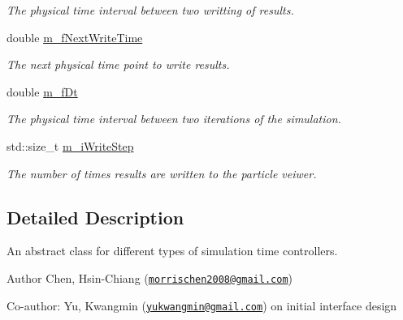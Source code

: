 \begin{DoxyCompactItemize}
\begin{DoxyCompactList}\small\item\em The physical time interval between two writting of results. \end{DoxyCompactList}\item 
\hypertarget{classTimeController_a497f8f5542f43a7a0975bf090ad0d232}{double \hyperlink{classTimeController_a497f8f5542f43a7a0975bf090ad0d232}{m\-\_\-f\-Next\-Write\-Time}}\label{classTimeController_a497f8f5542f43a7a0975bf090ad0d232}

\begin{DoxyCompactList}\small\item\em The next physical time point to write results. \end{DoxyCompactList}\item 
\hypertarget{classTimeController_acd5be58667699b78c72210dd05425c19}{double \hyperlink{classTimeController_acd5be58667699b78c72210dd05425c19}{m\-\_\-f\-Dt}}\label{classTimeController_acd5be58667699b78c72210dd05425c19}

\begin{DoxyCompactList}\small\item\em The physical time interval between two iterations of the simulation. \end{DoxyCompactList}\item 
\hypertarget{classTimeController_ad133665c62f56e80c9c7a9d6f1820934}{std\-::size\-\_\-t \hyperlink{classTimeController_ad133665c62f56e80c9c7a9d6f1820934}{m\-\_\-i\-Write\-Step}}\label{classTimeController_ad133665c62f56e80c9c7a9d6f1820934}

\begin{DoxyCompactList}\small\item\em The number of times results are written to the particle veiwer. \end{DoxyCompactList}\end{DoxyCompactItemize}


\subsection{Detailed Description}
An abstract class for different types of simulation time controllers. 

\begin{DoxyAuthor}{Author}
Chen, Hsin-\/\-Chiang (\href{mailto:morrischen2008@gmail.com}{\tt morrischen2008@gmail.\-com})
\end{DoxyAuthor}
Co-\/author\-: Yu, Kwangmin (\href{mailto:yukwangmin@gmail.com}{\tt yukwangmin@gmail.\-com}) on initial interface design

